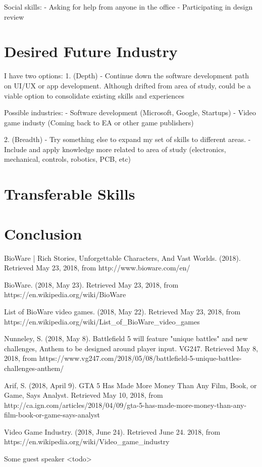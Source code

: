 \documentclass[10pt,letterpaper]{article}
\begin{document}
Social skills:
- Asking for help from anyone in the office
- Participating in design review

\section{Desired Future Industry}\label{desired-future-industry}

I have two options:
1. (Depth)
- Continue down the software development path on UI/UX or app development. Although drifted from area of study, could be a viable option to consolidate existing skills and experiences

Possible industries:
- Software development (Microsoft, Google, Startups)
- Video game industy (Coming back to EA or other game publishers)

2. (Breadth)
- Try something else to expand my set of skills to different areas.
- Include and apply knowledge more related to area of study (electronics, mechanical, controls, robotics, PCB, etc)

\section{Transferable Skills}\label{transferable-skills}

\section*{Conclusion}\label{conclusion}

\begin{thebibliography}{}

BioWare | Rich Stories, Unforgettable Characters, And Vast Worlds. (2018). Retrieved May 23, 2018, from http://www.bioware.com/en/ 

BioWare. (2018, May 23). Retrieved May 23, 2018, from https://en.wikipedia.org/wiki/BioWare

List of BioWare video games. (2018, May 22). Retrieved May 23, 2018, from https://en.wikipedia.org/wiki/List\_of\_BioWare\_video\_games

Nunneley, S. (2018, May 8). Battlefield 5 will feature "unique battles" and new challenges, Anthem to be designed around player input. VG247. Retrieved May 8, 2018, from https://www.vg247.com/2018/05/08/battlefield-5-unique-battles-challenges-anthem/

Arif, S. (2018, April 9). GTA 5 Has Made More Money Than Any Film, Book, or Game, Says Analyst. Retrieved May 10, 2018, from http://ca.ign.com/articles/2018/04/09/gta-5-has-made-more-money-than-any-film-book-or-game-says-analyst

Video Game Industry. (2018, June 24). Retrieved June 24. 2018, from https://en.wikipedia.org/wiki/Video\_game\_industry

Some guest speaker <todo>

\end{thebibliography}
\end{document}
